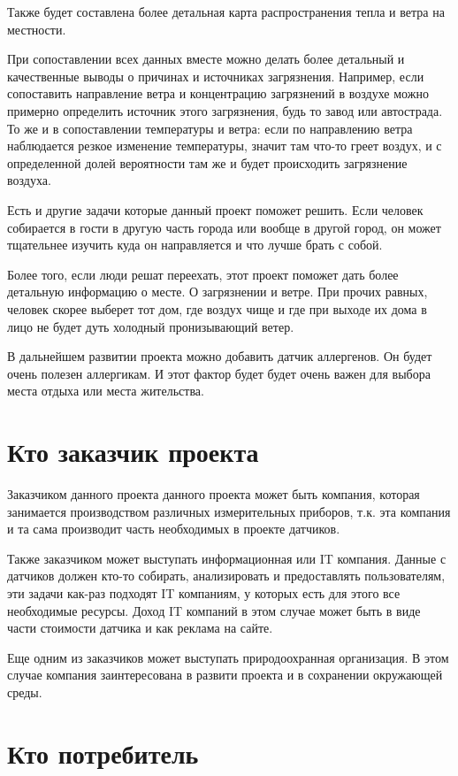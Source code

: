 \documentclass[a4paper,14pt]{article}
\begin{document}
Также будет составлена более детальная карта распространения тепла и ветра на местности. 

При сопоставлении всех данных вместе можно делать более детальный и качественные выводы о причинах и источниках загрязнения. Например, если сопоставить направление ветра и концентрацию загрязнений в воздухе можно примерно определить источник этого загрязнения, будь то завод или автострада. То же и в сопоставлении температуры и ветра: если по направлению ветра наблюдается резкое изменение температуры, значит там что-то греет воздух, и с определенной долей вероятности там же и будет происходить загрязнение воздуха.

Есть и другие задачи которые данный проект поможет решить. Если человек собирается в гости в другую часть города или вообще в другой город, он может тщательнее изучить куда он направляется и что лучше брать с собой.

Более того, если люди решат переехать, этот проект поможет дать более детальную информацию о месте. О загрязнении и ветре. При прочих равных, человек скорее выберет тот дом, где воздух чище и где при выходе их дома в лицо не будет дуть холодный пронизывающий ветер.

В дальнейшем развитии проекта можно добавить датчик аллергенов. Он будет очень полезен аллергикам. И этот фактор будет будет очень важен для выбора места отдыха или места жительства.

\section{ Кто заказчик проекта}

Заказчиком данного проекта данного проекта может быть компания, которая занимается производством различных измерительных приборов, т.к. эта компания и та сама производит часть необходимых в проекте датчиков.

Также заказчиком может выступать информационная или IT компания. Данные с датчиков должен кто-то собирать, анализировать и предоставлять пользователям, эти задачи как-раз подходят IT компаниям, у которых есть для этого все необходимые ресурсы. Доход IT компаний в этом случае может быть в виде части стоимости датчика и как реклама на сайте.

Еще одним из заказчиков может выступать природоохранная организация. В этом случае компания заинтересована в развити проекта и в сохранении окружающей среды.

\section{ Кто потребитель}
\end{document}
